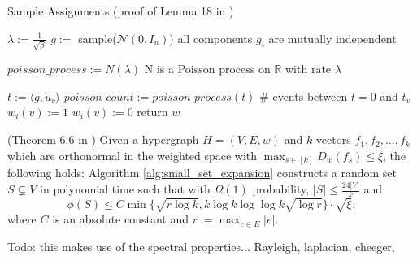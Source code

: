 \begin{algorithm}[htpb]
	\caption{Sample Assignments (proof of Lemma 18 in \cite{LouisM14}) \label{alg:sample_assignments}} 
	\begin{algorithmic}
		\State $\lambda := \frac{1}{\sqrt{\beta}}$
			\State $g:=$ sample($\mathcal{N}(0,I_n)$) \Comment all components $g_i$ are mutually independent 
	
	\State $poisson\_process := N(\lambda)$ \Comment N is a Poisson process on $\mathbb{R}$ with rate $\lambda$
		 
	
	
	\State $t := \langle g, \tilde{u}_v \rangle $
	\State $poisson\_count := poisson\_process(t)$ \Comment \# events between $t=0$ and $t_v$
	\State $w_i(v) := 1$
	\Else
	\State  $w_i(v) := 0$
	\EndIf
	\EndFor
	\EndFor
	\State return $w$
	\EndFunction %
\end{algorithmic}
\end{algorithm}	
\begin{fact}{(Theorem 6.6 in \cite{ChanLTZ16})}\label{fact:small_xi}
	Given a hypergraph $H = (V, E, w)$ and $k$ vectors $f_1, f_2, \ldots , f_k$ which are orthonormal in the weighted space with $ \max_{s \in [k]} D_w(f_s) \le \xi $, the following holds: Algorithm \ref{alg:small_set_expansion} constructs a random set $S \subsetneq V$ in polynomial time such that with $\Omega(1)$ probability, $|S| \le \frac{24|V|}{k}$ and
	 \begin{equation}\label{eq:small_expansion}
	 \phi(S) \le C \min\{\sqrt{r \log k}, k \log k  \log \log k \sqrt{\log r} \} \cdot \sqrt{\xi},
	 \end{equation}
	 where $C$ is an absolute constant and $r := \max_{e\in E} |e|$.
\end{fact}



Todo: this makes use of the spectral properties... Rayleigh, laplacian, cheeger, 







